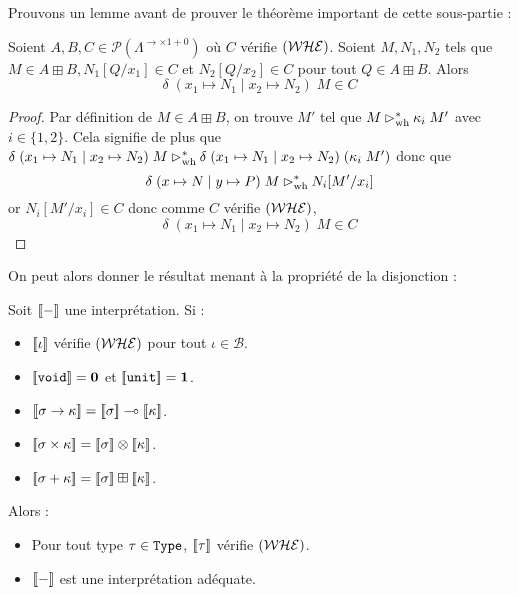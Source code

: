 Prouvons un lemme avant de prouver le théorème important de cette sous-partie :

\begin{lem}
    Soient $A,B,C\in\mathcal P(\Lambda^{\to\times1+0})$ où $C$ vérifie $(\mathcal {WHE})$. Soient $M,N_1,N_2$ tels que $M\in A\boxplus B, N_1[Q/x_1]\in C$ et $N_2[Q/x_2]\in C$ pour tout $Q\in A\boxplus B$. Alors $$\delta \;(x_1\mapsto N_1\mid x_2\mapsto N_2)\;M\in C$$
\end{lem}

\begin{proof}
    Par définition de $M\in A\boxplus B$, on trouve $M'$ tel que $M\rhd_{\mathrm{wh}}^* \kappa_i\;M'$ avec $i\in\{1,2\}$. Cela signifie de plus que $\delta\;(x_1\mapsto N_1\mid x_2\mapsto N_2)\;M \rhd_{\mathrm{wh}}^* \delta\;(x_1\mapsto N_1\mid x_2\mapsto N_2)\;(\kappa_i\;M')$ donc que $$\delta\;(x\mapsto N\mid y\mapsto P)\;M \rhd_{\mathrm{wh}}^* N_i[M'/x_i]$$ or $N_i[M'/x_i]\in C$ donc comme $C$ vérifie $(\mathcal {WHE})$, $$\delta \;(x_1\mapsto N_1\mid x_2\mapsto N_2)\;M\in C$$
\end{proof}

On peut alors donner le résultat menant à la propriété de la disjonction :

\begin{them}
    Soit $[\![ - ]\!]$ une interprétation. Si :
    \begin{itemize}[label=$\bullet$]
        \item $[\![ \iota ]\!]$ vérifie $(\mathcal {WHE})$ pour tout $\iota\in\mathcal B$.
        \item $[\![ \texttt{void} ]\!] = \boldsymbol 0$ et $[\![ \texttt{unit} ]\!] = \boldsymbol 1$.
        \item $[\![ \sigma\to\kappa ]\!]=[\![ \sigma ]\!]\multimap[\![ \kappa ]\!]$.
        \item $[\![ \sigma\times\kappa ]\!]=[\![ \sigma ]\!]\otimes[\![ \kappa ]\!]$.
        \item $[\![ \sigma+\kappa ]\!]=[\![ \sigma ]\!]\boxplus[\![ \kappa ]\!]$.
    \end{itemize}

    Alors :
    \begin{itemize}[label=$\bullet$]
        \item Pour tout type $\tau\in\texttt{Type}$, $[\![ \tau ]\!]$ vérifie $(\mathcal {WHE})$.
        \item $[\![ - ]\!]$ est une interprétation adéquate.
    \end{itemize}
\end{them}


